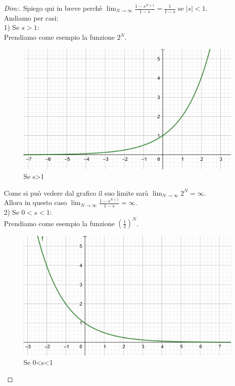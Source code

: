 \begin{proof}[Dim:] Spiego qui in breve perchè $\lim_{N \to \infty} \frac{ 1-s^{N+1} }{ 1-s } = \frac{1}{1-s} $ se $ |s|<1$.\\
	
	Andiamo per casi:\\
	1) Se $ s>1 $:\\
	Prendiamo come esempio la funzione $ 2^N $.\\
	
	\begin{figure}[h]
		\centering
		\includegraphics[scale=0.5]{immagini/esp1}
		\caption{ Se s>1 }
		\label{fig: esp1}
	\end{figure}
	
	Come si può vedere dal grafico il suo limite sarà $ \lim_{N \to \infty} 2^N = \infty $.\\
	Allora in questo caso $ \lim_{N \to \infty} \frac{ 1-s^{N+1} }{ 1-s } = \infty $.\\
	
	2) Se $ 0<s<1 $:\\
	Prendiamo come esempio la funzione $ (\frac{1}{2})^N $.\\
	
	\begin{figure}[h]
		\centering
		\includegraphics[scale=0.5]{immagini/esp2}
		\caption{ Se 0<s<1 }
		\label{fig: esp2}
	\end{figure}


\end{proof}

